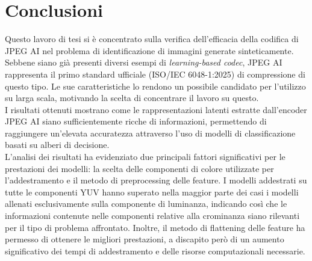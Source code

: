 \chapter{Conclusioni}\label{ch:conclusioni}
Questo lavoro di tesi si è concentrato sulla verifica dell'efficacia della codifica di JPEG AI nel problema di identificazione di immagini generate sinteticamente. Sebbene siano già presenti diversi esempi di \textit{learning-based codec}, JPEG AI rappresenta il primo standard ufficiale (ISO/IEC 6048-1:2025) di compressione di questo tipo. Le sue caratteristiche lo rendono un possibile candidato per l'utilizzo su larga scala, motivando la scelta di concentrare il lavoro su questo.\\
I risultati ottenuti mostrano come le rappresentazioni latenti estratte dall'encoder JPEG AI siano sufficientemente ricche di informazioni, permettendo di raggiungere un'elevata accuratezza attraverso l'uso di modelli di classificazione basati su alberi di decisione.\\
L'analisi dei risultati ha evidenziato due principali fattori significativi per le prestazioni dei modelli: la scelta delle componenti di colore utilizzate per l'addestramento e il metodo di preprocessing delle feature. I modelli addestrati su tutte le componenti YUV hanno superato nella maggior parte dei casi i modelli allenati esclusivamente sulla componente di luminanza, indicando così che le informazioni contenute nelle componenti relative alla crominanza siano rilevanti per il tipo di problema affrontato. Inoltre, il metodo di flattening delle feature ha permesso di ottenere le migliori prestazioni, a discapito però di un aumento significativo dei tempi di addestramento e delle risorse computazionali necessarie.\\
